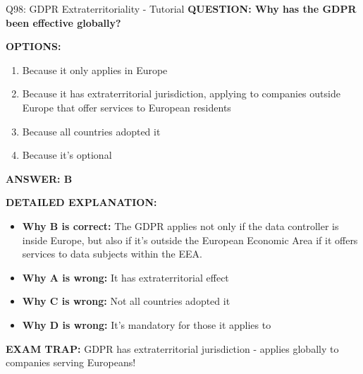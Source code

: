 \documentclass[8pt]{beamer}
\begin{document}
	\begin{frame}{Q98: GDPR Extraterritoriality - Tutorial}
		\fontsize{6.5}{7.5}\selectfont
		\textbf{QUESTION: Why has the GDPR been effective globally?}
		
		\vspace{0.1cm}
		\textbf{OPTIONS:}
		\begin{enumerate}
			\item Because it only applies in Europe
			\item Because it has extraterritorial jurisdiction, applying to companies outside Europe that offer services to European residents
			\item Because all countries adopted it
			\item Because it's optional
		\end{enumerate}
		
		\vspace{0.1cm}
		\textcolor{myblue}{\textbf{ANSWER: B}}
		
		\vspace{0.1cm}
		\textbf{DETAILED EXPLANATION:}
		\begin{itemize}
			\item \textbf{Why B is correct:} The GDPR applies not only if the data controller is inside Europe, but also if it's outside the European Economic Area if it offers services to data subjects within the EEA.
			\item \textbf{Why A is wrong:} It has extraterritorial effect
			\item \textbf{Why C is wrong:} Not all countries adopted it
			\item \textbf{Why D is wrong:} It's mandatory for those it applies to
		\end{itemize}
		
		\textcolor{myred}{\textbf{EXAM TRAP:}} GDPR has \textcolor{myblue}{extraterritorial jurisdiction} - applies globally to companies serving Europeans!
	\end{frame}
	
\end{document}
